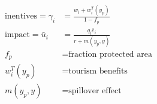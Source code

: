 \documentclass[10pt]{article}
\begin{document}
\begin{align*}\text{inentives} = \gamma_i & = \frac{w_i+w_i^T(y_p)}{1-f_p} \\
\text{impact} = \bar{u}_i & =\frac{q_i \bar{e}_i}{r+m(y_p,y)} \\
f_p &= \text{fraction protected area} \\
w_i^T(y_p) & =\text{tourism benefits} \\
m(y_p,y) & =\text{spillover effect}
\end{align*}
\end{document}
